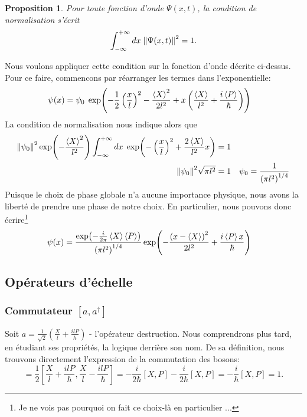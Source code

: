 \documentclass[11pt,oneside,a4paper]{article}
\newcommand{\h}{\ensuremath{\hbar}}
\newtheorem{property}[theorem]{Proposition}
\begin{document}
\begin{property}
    Pour toute fonction d'onde $\Psi(x,t)$, la condition de normalisation s'écrit 
    \begin{equation}
        \int_{-\infty}^{+\infty}dx \; \norm{\Psi(x,t)}^2= 1.
    \end{equation}
\end{property}
Nous voulons appliquer cette condition sur la fonction d'onde décrite ci-dessus. Pour ce faire, commencons par réarranger les termes dans l'exponentielle:
\begin{align}
  \psi(x) &= \psi_0 \; \exp(-\frac{1}{2}\left(\frac{x}{l}\right)^2-\frac{\expval{X}^2}{2l^2}+x\left(\frac{\expval{X}}{l^2}+\frac{i\expval{P}}{\h}\right))
\end{align}
La condition de normalisation nous indique alors que
\begin{align}
  \norm{\psi_0}^2 \exp(-\frac{\expval{X}^2}{l^2})\int_{-\infty}^{+\infty} dx \; \exp(-\left(\frac{x}{l}\right)^2+\frac{2\expval{X}}{l^2}x) &= 1\\
  \norm{\psi_0}^2 \sqrt{\pi l^2} &= 1 &\psi_0 = \frac{1}{\left(\pi l^2\right)^{1/4}}
\end{align} 
Puisque le choix de phase globale n'a aucune importance physique, nous avons la liberté de prendre une phase de notre choix. En particulier, nous pouvons donc écrire\footnote{Je ne vois pas pourquoi on fait ce choix-là en particulier ...} 
\begin{align}
  \psi(x) &= \frac{\exp(-\frac{i}{2\pi}\expval{X}\expval{P})}{\left(\pi l^2\right)^{1/4}}\exp(-\frac{\left(x-\expval{X}\right)^2}{2l^2}+\frac{i\expval{P}x}{\hbar})
\end{align}
\subsection{Opérateurs d'échelle}
\subsubsection{Commutateur $[a,a^\dagger]$}
Soit $a = \frac{1}{\sqrt{2}} \left(\frac{X}{l}+\frac{ilP}{\hbar}\right)$ - l'opérateur destruction. Nous comprendrons plus tard, en étudiant ses propriétés, la logique derrière son nom. De sa définition, nous trouvons directement l'expression de la commutation des bosons:
\begin{equation}
    [a,a^\dagger] = \frac{1}{2} [\frac{X}{l}+\frac{ilP}{\hbar},\frac{X}{l}-\frac{ilP}{\hbar}] = -\frac{i}{2\h} [X,P]-\frac{i}{2\h}[X,P] = -\frac{i}{\h}[X,P] = 1. 
\end{equation}
\end{document}
